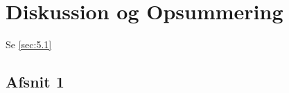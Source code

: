 \chapter{Diskussion og Opsummering}
\label{Ch:5}

Se \vref{sec:5.1}


\section{Afsnit 1}
\label{sec:5.1}

